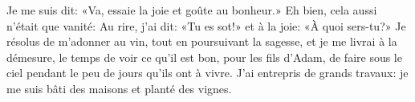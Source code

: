 Je me suis dit: «Va, essaie la joie et goûte au bonheur.»
	Eh bien, cela aussi n’était que vanité:
	Au rire, j’ai dit: «Tu es sot!» et à la joie:
		«À quoi sers-tu?»
Je résolus de m’adonner au vin, tout en poursuivant la sagesse,
	et je me livrai à la démesure,
	le temps de voir ce qu’il est bon, pour les fils d’Adam, de faire sous le ciel
	pendant le peu de jours qu’ils ont à vivre.
J’ai entrepris de grands travaux: je me suis bâti des maisons et planté des vignes.
